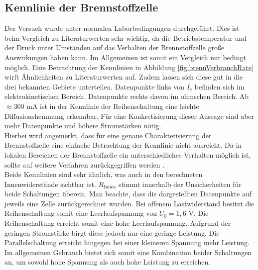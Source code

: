 \documentclass[a4paper,usenatbib]{aspdoc}
\begin{document}
        
        \subsection{Kennlinie der Brennstoffzelle}
            Der Versuch wurde unter normalen Laborbedingungen durchgeführt. Dies ist beim Vergleich zu Literaturwerten sehr wichtig, da die Betriebstemperatur und der Druck unter Umständen auf das Verhalten der Brennstoffzelle große Auswirkungen haben kann. Im Allgemeinen ist somit ein Vergleich nur bedingt möglich. Eine Betrachtung der Kennlinien in Abbildung \ref{fig:brennVerbrauchRate} wirft Ähnlichkeiten zu Literaturwerten auf. Zudem lassen sich diese gut in die drei bekannten Gebiete unterteilen. Datenpunkte links von $I_e$ befinden sich im elektrokinetischen Bereich. Datenpunkte rechts davon im ohmschen Bereich. Ab $\approx 300$ mA ist in der Kennlinie der Reihenschaltung eine leichte Diffusionshemmung erkennbar. Für eine Konkretisierung dieser Aussage sind aber mehr Datenpunkte und höhere Stromstärken nötig.
            \\
            Hierbei wird angemerkt, dass für eine genaue Charakterisierung der Brennstoffzelle eine einfache Betrachtung der Kennlinie nicht ausreicht. Da in lokalen Bereichen der Brennstoffzelle ein unterschiedliches Verhalten möglich ist, sollte auf weitere Verfahren zurückgegriffen werden \citep{membran}.
            \\
            Beide Kennlinien sind sehr ähnlich, was auch in den berechneten Innenwiderstände sichtbar ist. $R_{\mathrm{Innen}}$ stimmt innerhalb der Unsicherheiten für beide Schaltungen überein. Man beachte, dass die dargestellten Datenpunkte auf jeweils eine Zelle zurückgerechnet wurden. Bei offenem Lastwiderstand besitzt die Reihenschaltung somit eine Leerlaufspannung von $U_0 = 1,6$ V. Die Reihenschaltung erreicht somit eine hohe Leerlaufspannung. Aufgrund der geringen Stromstärke birgt diese jedoch nur eine geringe Leistung. Die Parallelschaltung erreicht hingegen bei einer kleineren Spannung mehr Leistung. Im allgemeinen Gebrauch bietet sich somit eine Kombination beider Schaltungen an, um sowohl hohe Spannung als auch hohe Leistung zu erreichen.
            
            
\end{document}
